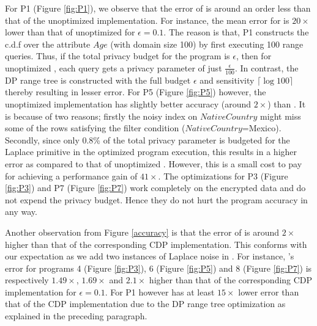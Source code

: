For P1 (Figure \ref{fig:P1}), we observe that the error of \system is around an order less than that of the unoptimized implementation. For instance, the mean error for \system is $20\times$ lower than that of unoptimized \system for $\epsilon=0.1$.  The reason is that, P1 constructs the c.d.f over the attribute $Age$ (with domain size 100) by first executing 100 range queries. %
Thus, if the total privacy budget for the program is $\epsilon$, then for unoptimized \system, each query gets a privacy parameter of just $\frac{\epsilon}{100}$. In contrast, the DP range tree is constructed with the full budget $\epsilon$ and sensitivity $\lceil\log 100\rceil$ thereby resulting in lesser error. For P5 (Figure \ref{fig:P5}) however, the unoptimized implementation has slightly better accuracy (around $2\times$) than \system. It is because of two reasons; firstly the noisy index on $NativeCountry$ might miss some of the rows satisfying the filter condition ($NativeCountry$=Mexico). Secondly, since only 0.8\% of the total privacy parameter is budgeted for the \textsf{Laplace} primitive in the optimized program execution, this results in a higher error as compared to that of unoptimized \system. However, this is a small  cost to pay for achieving a performance gain of $41\times$. The optimizations for P3 (Figure \ref{fig:P3}) and P7 (Figure \ref{fig:P7}) work completely on the encrypted data and do not expend the privacy budget. Hence they do not hurt the program accuracy in any way.
 
 Another observation from Figure \ref{accuracy} is that the error of \system is around $2\times$ higher than that of the corresponding \textsf{CDP} implementation. This conforms with our expectation as we add two instances of Laplace noise in \system. For instance, \system's error for programs 4 (Figure \ref{fig:P3}), 6 (Figure \ref{fig:P5}) and 8 (Figure \ref{fig:P7})  is respectively $1.49\times$, $1.69 \times$ and $2.1\times$ higher  than that of the corresponding \textsf{CDP} implementation for $\epsilon=0.1$.  For P1 however \system has at least $15\times$ lower error than that of the \textsf{CDP} implementation due to the DP range tree optimization as explained in the preceding paragraph.
 

